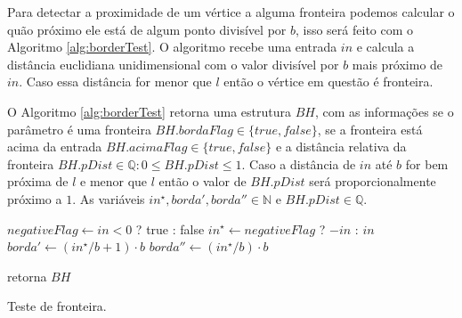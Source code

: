 Para detectar a proximidade de um vértice a alguma fronteira podemos calcular o 
quão próximo ele está de algum ponto divisível por $b$, isso será feito com 
o Algoritmo \ref{alg:borderTest}. O algoritmo recebe uma entrada $in$ e calcula
a distância euclidiana unidimensional com o valor divisível por $b$ mais próximo 
de $in$. Caso essa distância for menor que $l$ então o vértice em questão é 
fronteira.

O Algoritmo \ref{alg:borderTest} retorna uma estrutura $BH$, com as informações
se o parâmetro é uma fronteira $BH.bordaFlag \in \{true, false\}$, se a fronteira 
está acima da entrada $BH.acimaFlag \in \{true, false\}$ e a distância relativa 
da fronteira $BH.pDist \in \mathbb{Q}: 0 \leq BH.pDist \leq 1$. Caso a distância de $in$ até $b$ for bem 
próxima de $l$ e menor que $l$ então o valor de $BH.pDist$ será proporcionalmente
próximo a $1$. As variáveis
$in^{\star}, borda', borda'' \in \mathbb{N}$ e $BH.pDist \in \mathbb{Q}$.

\begin{algorithm}[H]\label{alg:borderTest}%
    $negativeFlag \leftarrow in < 0$ ? true : false\;
    $in^{\star} \leftarrow negativeFlag$ ? $-in$ : $in$\;
    $borda' \leftarrow (in^{\star}/b +1) \cdot b$\;
    $borda'' \leftarrow (in^{\star}/b) \cdot b$\;
    
    retorna $BH$\;
    \caption{Teste de fronteira.}
\end{algorithm}

